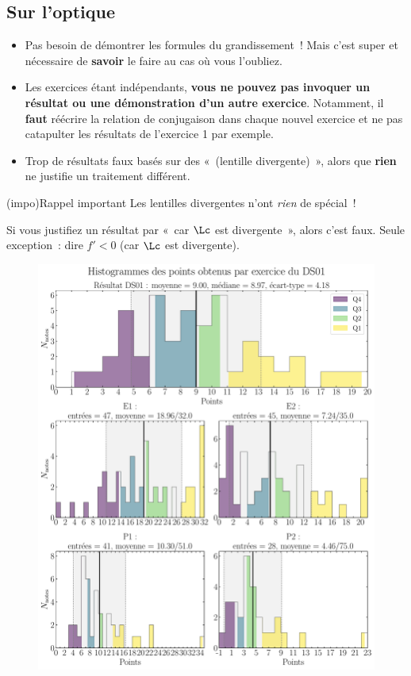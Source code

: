 \documentclass[a4paper, 11pt, final, garamond]{book}
\begin{document}
\subsection{Sur l'optique}
\begin{itemize}
	\item Pas besoin de démontrer les formules du grandissement~! Mais c'est super
	      et nécessaire de \textbf{savoir} le faire au cas où vous l'oubliez.
	\item Les exercices étant indépendants, \textbf{vous ne pouvez pas invoquer un
		      résultat ou une démonstration d'un autre exercice}. Notamment, il
	      \textbf{faut} réécrire la relation de conjugaison dans chaque nouvel
	      exercice et ne pas catapulter les résultats de l'exercice 1 par exemple.
	\item Trop de résultats faux basés sur des «~(lentille divergente)~», alors
	      que \textbf{rien} ne justifie un traitement différent.
\end{itemize}

\begin{tcn}[bld,cnt,fontupper=\Large](impo){Rappel important}
	Les lentilles divergentes n'ont \textit{rien} de spécial~!
\end{tcn}

Si vous justifiez un résultat par «~car $\Lc$ est divergente~», alors c'est
faux. Seule exception~: dire $f' < 0$ (car $\Lc$ est divergente).

\begin{figure}[htbp!]
	\centering
	\includegraphics[width=1\linewidth]{DS01_hist_all}
\end{figure}
\end{document}
